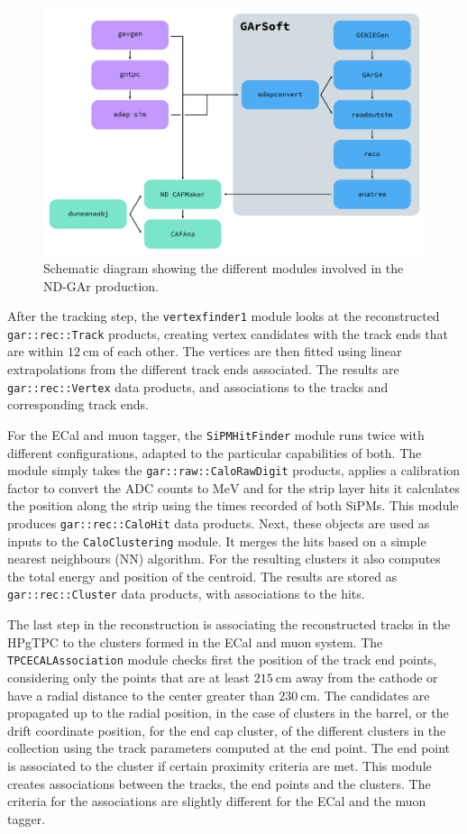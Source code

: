 \begin{figure}[t]
	\centering
	\includegraphics[width=.90\linewidth]{Images/GArSoft_PID/gar_workflow.pdf}
	\caption{Schematic diagram showing the different modules involved in the ND-GAr production.}
	\label{fig:gar_workflow}
\end{figure}

After the tracking step, the \texttt{vertexfinder1} module looks at the reconstructed \texttt{gar::rec::Track} products, creating vertex candidates with the track ends that are within $12~\mathrm{cm}$ of each other. The vertices are then fitted using linear extrapolations from the different track ends associated. The results are \texttt{gar::rec::Vertex} data products, and associations to the tracks and corresponding track ends.

For the ECal and muon tagger, the \texttt{SiPMHitFinder} module runs twice with different configurations, adapted to the particular capabilities of both. The module simply takes the \texttt{gar::raw::CaloRawDigit} products, applies a calibration factor to convert the ADC counts to $\mathrm{MeV}$ and for the strip layer hits it calculates the position along the strip using the times recorded of both SiPMs. This module produces \texttt{gar::rec::CaloHit} data products. Next, these objects are used as inputs to the \texttt{CaloClustering} module. It merges the hits based on a simple nearest neighbours (NN) algorithm. For the resulting clusters it also computes the total energy and position of the centroid. The results are stored as \texttt{gar::rec::Cluster} data products, with associations to the hits.

The last step in the reconstruction is associating the reconstructed tracks in the HPgTPC to the clusters formed in the ECal and muon system. The \texttt{TPCECALAssociation} module checks first the position of the track end points, considering only the points that are at least $215~\mathrm{cm}$ away from the cathode or have a radial distance to the center greater than $230~\mathrm{cm}$. The candidates are propagated up to the radial position, in the case of clusters in the barrel, or the drift coordinate position, for the end cap cluster, of the different clusters in the collection using the track parameters computed at the end point. The end point is associated to the cluster if certain proximity criteria are met. This module creates associations between the tracks, the end points and the clusters. The criteria for the associations are slightly different for the ECal and the muon tagger.

